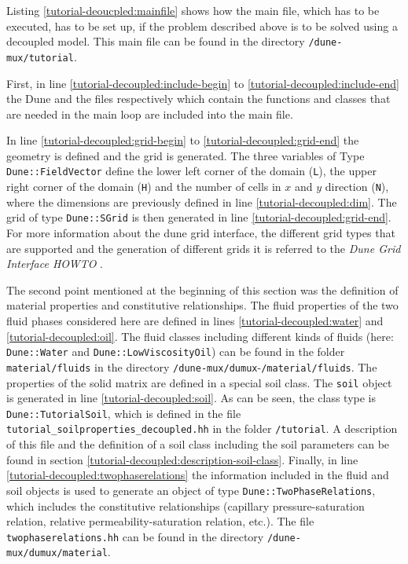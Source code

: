 Listing \ref{tutorial-deoucpled:mainfile} shows how the main file, which has to be executed, has to be set up, if the problem described above is to be solved using a decoupled model. This main file can be found in the directory \texttt{/dune-mux/tutorial}.

\begin{lst}\label{tutorial-deoucpled:mainfile} \mbox{}

\end{lst}

First, in line \ref{tutorial-decoupled:include-begin} to \ref{tutorial-decoupled:include-end} the Dune and the \Dumux files respectively which contain the functions and classes that are needed in the main loop are included into the main file.

In line \ref{tutorial-decoupled:grid-begin} to \ref{tutorial-decoupled:grid-end} the geometry is defined and the grid is generated. The three variables of Type \texttt{Dune::FieldVector} define the lower left corner of the domain (\texttt{L}), the upper right corner of the domain (\texttt{H}) and the number of cells in $x$ and $y$ direction (\texttt{N}), where the dimensions are previously defined in line \ref{tutorial-decoupled:dim}. The grid of type \texttt{Dune::SGrid} is then generated in line \ref{tutorial-decoupled:grid-end}. For more information about the dune grid interface, the different grid types that are supported and the generation of different grids it is referred to the \textit{Dune Grid Interface HOWTO} \cite{DUNE-HP}.

The second point mentioned at the beginning of this section was the definition of material properties and constitutive relationships. The fluid properties of the two fluid phases considered here are defined in lines \ref{tutorial-decoupled:water} and \ref{tutorial-decoupled:oil}. The fluid classes including different kinds of fluids (here: \texttt{Dune::Water} and \texttt{Dune::LowViscosityOil}) can be found in the folder \texttt{material/fluids} in the directory \texttt{/dune-mux/dumux}-\texttt{/material/fluids}. The properties of the solid matrix are defined in a special soil class. The \texttt{soil} object is generated in line \ref{tutorial-decoupled:soil}. As can be seen, the class type is \texttt{Dune::TutorialSoil}, which is defined in the file \texttt{tutorial\_soilproperties\_decoupled.hh} in the folder \texttt{/tutorial}. A description of this file and the definition of a soil class including the soil parameters can be found in section \ref{tutorial-decoupled:description-soil-class}. Finally, in line \ref{tutorial-decoupled:twophaserelations} the information included in the fluid and soil objects is used to generate an object of type \texttt{Dune::TwoPhaseRelations}, which includes the constitutive relationships (capillary pressure-saturation relation, relative permeability-saturation relation, etc.). The file \texttt{twophaserelations.hh} can be found in the directory \texttt{/dune-mux/dumux/material}.

